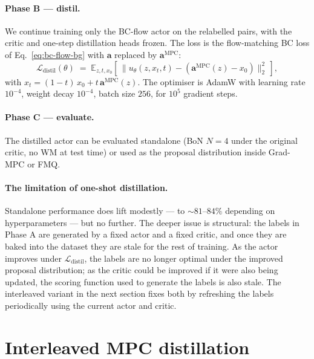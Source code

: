 \paragraph{Phase B --- distil.} We continue training only the BC-flow actor on the relabelled pairs, with the critic and one-step distillation heads frozen. The loss is the flow-matching BC loss of Eq.~\eqref{eq:bc-flow-bg} with $\mathbf{a}$ replaced by $\mathbf{a}^{\text{MPC}}$:
\begin{equation}
    \mathcal{L}_{\text{distil}}(\theta) \;=\;
        \mathbb{E}_{z, t, x_0}\!\left[\,
            \big\| u_\theta(z, x_t, t) - (\mathbf{a}^{\text{MPC}}(z) - x_0) \big\|_2^2\,\right],
    \label{eq:mpc-distil-loss}
\end{equation}
with $x_t = (1-t)\,x_0 + t\,\mathbf{a}^{\text{MPC}}(z)$. The optimiser is AdamW with learning rate $10^{-4}$, weight decay $10^{-4}$, batch size $256$, for $10^5$ gradient steps.

\paragraph{Phase C --- evaluate.} The distilled actor can be evaluated standalone (BoN $N = 4$ under the original critic, no WM at test time) or used as the proposal distribution inside Grad-MPC or FMQ.

\paragraph{The limitation of one-shot distillation.} Standalone performance does lift modestly --- to $\sim 81$--$84\%$ depending on hyperparameters --- but no further. The deeper issue is structural: the labels in Phase A are generated by a fixed actor and a fixed critic, and once they are baked into the dataset they are stale for the rest of training. As the actor improves under $\mathcal{L}_{\text{distil}}$, the labels are no longer optimal under the improved proposal distribution; as the critic could be improved if it were also being updated, the scoring function used to generate the labels is also stale. The interleaved variant in the next section fixes both by refreshing the labels periodically using the current actor and critic.

\section{Interleaved MPC distillation}
\label{sec:mpc-interleaved}

